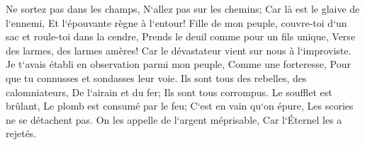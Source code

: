 \verse Ne sortez pas dans les champs, N`allez pas sur les chemins; Car là est le glaive de l`ennemi, Et l`épouvante règne à l`entour! 
\verse Fille de mon peuple, couvre-toi d`un sac et roule-toi dans la cendre, Prends le deuil comme pour un fils unique, Verse des larmes, des larmes amères! Car le dévastateur vient sur nous à l`improviste. 
\verse Je t`avais établi en observation parmi mon peuple, Comme une forteresse, Pour que tu connusses et sondasses leur voie. 
\verse Ils sont tous des rebelles, des calomniateurs, De l`airain et du fer; Ils sont tous corrompus. 
\verse Le soufflet est brûlant, Le plomb est consumé par le feu; C`est en vain qu`on épure, Les scories ne se détachent pas. 
\verse On les appelle de l`argent méprisable, Car l`Éternel les a rejetés. 

